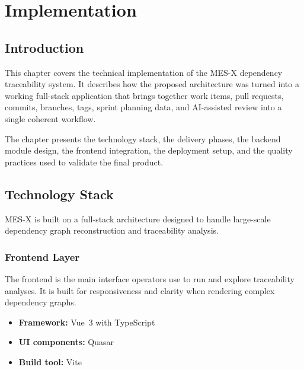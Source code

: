 \chapter{Implementation}

\section{Introduction}

This chapter covers the technical implementation of the MES-X dependency
traceability system. It describes how the proposed architecture was turned into
a working full-stack application that brings together work items, pull requests,
commits, branches, tags, sprint planning data, and AI-assisted review into a
single coherent workflow.

The chapter presents the technology stack, the delivery phases, the backend
module design, the frontend integration, the deployment setup, and the quality
practices used to validate the final product.

\section{Technology Stack}

MES-X is built on a full-stack architecture designed to handle large-scale
dependency graph reconstruction and traceability analysis.

\subsection{Frontend Layer}

The frontend is the main interface operators use to run and explore traceability
analyses. It is built for responsiveness and clarity when rendering complex
dependency graphs.

\begin{itemize}
  \item \textbf{Framework:} Vue~3 with TypeScript
  \item \textbf{UI components:} Quasar
  \item \textbf{Build tool:} Vite
\end{itemize}

